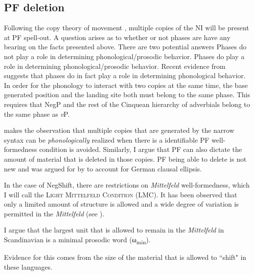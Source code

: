 \documentclass[12pt, letterpaper]{article}
\newcommand{\sub}[1]{\textsubscript{#1}}
\begin{document}
\subsection{PF deletion} \label{sec:PFDeletion}
\ea  Following the copy theory of movement \citet{chomskyMinimalistProgramLinguistic1993}, multiple copies of the NI will be present at PF spell-out. 
\ex A question arises as to whether or not phases are have any bearing on the facts presented above. 
\ex There are two potential answers
	\ea Phases do not play a role in determining phonological/prosodic behavior.  
	\ex Phases do play a role in determining phonological/prosodic behavior.
	\z 
\ex Recent evidence from \citet{weberPhasebasedConstraintsMatch2020} suggests that phases do in fact play a role in determining phonological behavior. 
\ex In order for the phonology to interact with two copies at the same time, the base generated position and the landing site both must belong to the same phase. 
	\ea This requires that NegP and the rest of the Cinquean hierarchy of adverbials \citep{cinqueAdverbsFunctionalHeads1999} belong to the same phase as \emph{v}P.
	\z

\ex \citet{kandybowiczGrammarRepetitionNupe2008} makes the observation that multiple copies that are generated by the narrow syntax can be \emph{phonologically} realized when there is a identifiable PF well-formedness condition is avoided. 
	\ea Similarly, I argue that PF can also dictate the amount of material that is deleted in those copies. 
	\ex PF being able to delete is not new and was argued for by \citet{ottDeletionClausalEllipsis2016} to account for German clausal ellipsis. 
	\z 

\ex In the case of NegShift, there are restrictions on \emph{Mittelfeld} well-formedness, which I will call the \textsc{Light Mittelfeld Condition} (LMC).
	\ea It has been observed that only a limited amount of structure is allowed and a wide degree of variation is permitted in the \emph{Mittelfeld} (see \cite{haiderMittelfeldPhenomenaScrambling2017}). 

	\ex I argue that the largest unit that is allowed to remain in the \emph{Mittelfeld} in Scandinavian is a minimal prosodic word (ω\sub{min}).
	\z 

\ex Evidence for this comes from the size of the material that is allowed to ``shift" in these languages. 
\end{document}
